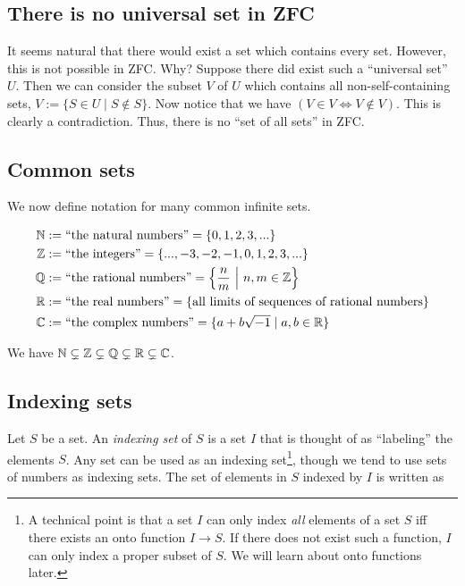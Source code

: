 \subsection*{There is no universal set in ZFC}

It seems natural that there would exist a set which contains every set. However, this is not possible in ZFC. Why? Suppose there did exist such a ``universal set'' $U$. Then we can consider the subset $V$ of $U$ which contains all non-self-containing sets, $V := \{ S \in U \mid S \notin S \}$. Now notice that we have $(V \in V \iff V \notin V)$. This is clearly a contradiction. Thus, there is no ``set of all sets'' in ZFC.

\subsection*{Common sets}

We now define notation for many common infinite sets.

\begin{align*}
    \mathbb{N} &:= \text{``the natural numbers''} = \{0, 1, 2, 3, ...\} \\
    \mathbb{Z} &:= \text{``the integers''} = \{..., -3, -2, -1, 0, 1, 2, 3, ... \} \\
    \mathbb{Q} &:= \text{``the rational numbers''} = \Big\{ \frac{n}{m} \text{ } \Big| \text{ } n, m \in \mathbb{Z} \Big\} \\
    \mathbb{R} &:= \text{``the real numbers''} = \{ \text{all limits of sequences of rational numbers} \} \\
    \mathbb{C} &:= \text{``the complex numbers''} = \{ a + b \sqrt{-1} \mid a, b \in \mathbb{R} \}
\end{align*}

We have $\mathbb{N} \subsetneq \mathbb{Z} \subsetneq \mathbb{Q} \subsetneq \mathbb{R} \subsetneq \mathbb{C}$.

\subsection*{Indexing sets}

Let $S$ be a set. An \textit{indexing set} of $S$ is a set $I$ that is thought of as ``labeling'' the elements $S$. Any set can be used as an indexing set\footnote{A technical point is that a set $I$ can only index \textit{all} elements of a set $S$ iff there exists an onto function $I \rightarrow S$. If there does not exist such a function, $I$ can only index a proper subset of $S$. We will learn about onto functions later.}, though we tend to use sets of numbers as indexing sets. The set of elements in $S$ indexed by $I$ is written as


